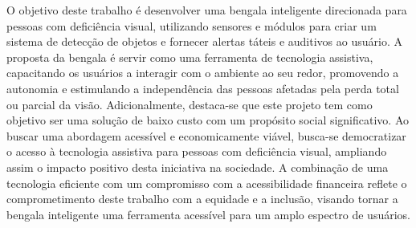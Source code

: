 O objetivo deste trabalho é desenvolver uma bengala inteligente direcionada para pessoas com deficiência visual, utilizando sensores e módulos para criar um sistema de detecção de objetos e fornecer alertas táteis e auditivos ao usuário. A proposta da bengala é servir como uma ferramenta de tecnologia assistiva, capacitando os usuários a interagir com o ambiente ao seu redor, promovendo a autonomia e estimulando a independência das pessoas afetadas pela perda total ou parcial da visão. Adicionalmente, destaca-se que este projeto tem como objetivo ser uma solução de baixo custo com um propósito social significativo. Ao buscar uma abordagem acessível e economicamente viável, busca-se democratizar o acesso à tecnologia assistiva para pessoas com deficiência visual, ampliando assim o impacto positivo desta iniciativa na sociedade. A combinação de uma tecnologia eficiente com um compromisso com a acessibilidade financeira reflete o comprometimento deste trabalho com a equidade e a inclusão, visando tornar a bengala inteligente uma ferramenta acessível para um amplo espectro de usuários.


